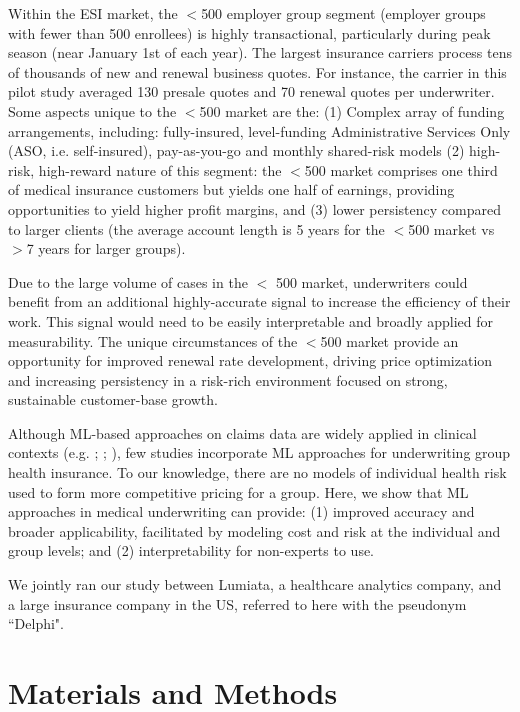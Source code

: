 \documentclass[letterpaper]{article} %
\begin{document}
Within the ESI market, the $<$500 employer group segment (employer groups with fewer than 500 enrollees) is highly transactional, particularly during peak season (near January 1st of each year). The largest insurance carriers process tens of thousands of new  and renewal business quotes.  For instance, the carrier in this pilot study averaged 130 presale quotes and 70 renewal quotes per underwriter.  Some aspects unique to the $<$500 market are the:
(1) Complex array of funding arrangements, including: fully-insured, level-funding Administrative Services Only (ASO, i.e. self-insured), pay-as-you-go and monthly shared-risk models \cite{GrowEmpInt}
(2) high-risk, high-reward nature of this segment:  the $<$500 market comprises one third of medical insurance customers but yields one half of earnings, providing opportunities to yield higher profit margins, and
(3) lower persistency compared to larger clients (the average account length is 5 years for the $<$500 market vs $>$7 years for larger groups).


Due to the large volume of cases in the $<$ 500 market, underwriters could benefit from an additional highly-accurate signal to increase the efficiency of their work.  This signal would need to be easily interpretable and broadly applied for measurability. The unique circumstances of the $<$500 market provide an opportunity for improved renewal rate development, driving price optimization and increasing persistency in a risk-rich environment focused on strong, sustainable customer-base growth.

Although ML-based approaches on claims data are widely applied in clinical contexts (e.g. \citeauthor{DM2} \citeyear{DM2}; \citeauthor{CostBloom} \citeyear{CostBloom}; \citeauthor{scalable} \citeyear{scalable}), few studies incorporate ML approaches for underwriting group health insurance.  To our knowledge, there are no models of individual health risk used to form more competitive pricing for a group. Here, we show that ML approaches in medical underwriting can provide: (1)  improved accuracy and broader applicability, facilitated by modeling cost and risk at the individual and group levels; and (2) interpretability for non-experts to use.


We jointly ran our study between Lumiata, a healthcare analytics company, and a large insurance company in the US, referred to here with the pseudonym ``Delphi".

\section*{Materials and Methods}
\end{document}

